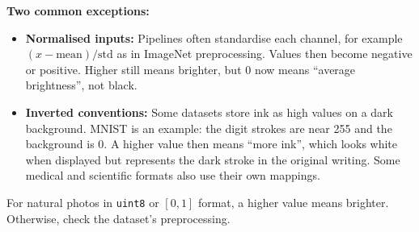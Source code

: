 \textbf{Two common exceptions:}
\begin{itemize}
  \item \textbf{Normalised inputs:} Pipelines often standardise each channel, for example $(x - \text{mean})/\text{std}$ as in ImageNet preprocessing. Values then become negative or positive. Higher still means brighter, but 0 now means ``average brightness'', not black.
  \item \textbf{Inverted conventions:} Some datasets store ink as high values on a dark background. MNIST is an example: the digit strokes are near 255 and the background is 0. A higher value then means ``more ink'', which looks white when displayed but represents the dark stroke in the original writing. Some medical and scientific formats also use their own mappings.
\end{itemize}

For natural photos in \texttt{uint8} or $[0, 1]$ format, a higher value means brighter. Otherwise, check the dataset's preprocessing.